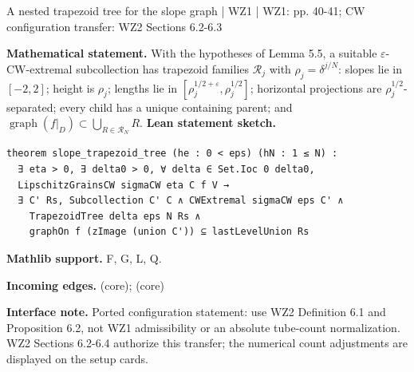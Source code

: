 \documentclass[10pt,a4paper]{article}
\newcommand{\nodecard}[1]{\hyperlink{node-#1}{\texttt{\detokenize{#1}}}}
\begin{document}
\begin{minipage}{\linewidth}
\hypertarget{node-C5_6}{}
\begin{tcolorbox}[colback=white,colframe=regularityfg,colbacktitle=regularitybg,coltitle=ink,boxrule=0.45pt,arc=1.6mm,left=3mm,right=3mm,top=2mm,bottom=2mm,title={\sffamily\bfseries WZ1 Corollary 5.6 / CW \hfill \texttt{C5\_6}}]
{\sffamily\small\color{muted}A nested trapezoid tree for the slope graph | WZ1 | WZ1: pp. 40-41; CW configuration transfer: WZ2 Sections 6.2-6.3}\par
\textbf{Mathematical statement.} With the hypotheses of Lemma 5.5, a suitable $\varepsilon$-CW-extremal subcollection has trapezoid families $\mathcal R_j$ with $\rho_j=\delta^{j/N}$:
slopes lie in $[-2,2]$; height is $\rho_j$; lengths lie in $[\rho_j^{1/2+\varepsilon},\rho_j^{1/2}]$; horizontal projections are $\rho_j^{1/2}$-separated; every child has a unique containing parent; and $\operatorname{graph}(f|_D)\subset\bigcup_{R\in\mathcal R_N}R$.
\smallskip\textbf{Lean statement sketch.}
\begin{Verbatim}[fontsize=\small,breaklines=true,breakanywhere=true,tabsize=2]
theorem slope_trapezoid_tree (he : 0 < eps) (hN : 1 ≤ N) :
  ∃ eta > 0, ∃ delta0 > 0, ∀ delta ∈ Set.Ioc 0 delta0,
  LipschitzGrainsCW sigmaCW eta C f V →
  ∃ C' Rs, Subcollection C' C ∧ CWExtremal sigmaCW eps C' ∧
    TrapezoidTree delta eps N Rs ∧
    graphOn f (zImage (union C')) ⊆ lastLevelUnion Rs
\end{Verbatim}
{\footnotesize\textbf{Mathlib support.} F, G, L, Q.\par
\textbf{Incoming edges.} \nodecard{L5_5} (core); \nodecard{Dtrap} (core)\par}
{\footnotesize\textbf{Interface note.}  Ported configuration statement: use WZ2 Definition 6.1 and Proposition 6.2, not WZ1 admissibility or an absolute tube-count normalization. WZ2 Sections 6.2-6.4 authorize this transfer; the numerical count adjustments are displayed on the setup cards.}
\end{tcolorbox}\end{minipage}\par\medskip
\end{document}
